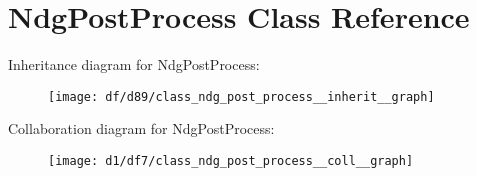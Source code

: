 \hypertarget{class_ndg_post_process}{}\section{Ndg\+Post\+Process Class Reference}
\label{class_ndg_post_process}


Inheritance diagram for Ndg\+Post\+Process\+:
\nopagebreak
\begin{figure}[H]
\begin{center}
\leavevmode
\texttt{[image: df/d89/class\_ndg\_post\_process\_\_inherit\_\_graph]}
\end{center}
\end{figure}


Collaboration diagram for Ndg\+Post\+Process\+:
\nopagebreak
\begin{figure}[H]
\begin{center}
\leavevmode
\texttt{[image: d1/df7/class\_ndg\_post\_process\_\_coll\_\_graph]}
\end{center}
\end{figure}
